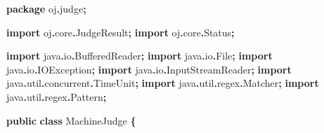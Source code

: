 \documentclass[
  11pt,
]{ctexart}
\newenvironment{Shaded}{\begin{snugshade}}{\end{snugshade}}
\newcommand{\ImportTok}[1]{#1}
\newcommand{\KeywordTok}[1]{\textcolor[rgb]{0.13,0.29,0.53}{\textbf{#1}}}
\newcommand{\NormalTok}[1]{#1}
\newcommand{\OperatorTok}[1]{\textcolor[rgb]{0.81,0.36,0.00}{\textbf{#1}}}
\begin{document}
\begin{Shaded}
\begin{Highlighting}[]
\KeywordTok{package}\ImportTok{ oj}\OperatorTok{.}\ImportTok{judge}\OperatorTok{;}

\KeywordTok{import} \ImportTok{oj}\OperatorTok{.}\ImportTok{core}\OperatorTok{.}\ImportTok{JudgeResult}\OperatorTok{;}
\KeywordTok{import} \ImportTok{oj}\OperatorTok{.}\ImportTok{core}\OperatorTok{.}\ImportTok{Status}\OperatorTok{;}

\KeywordTok{import} \ImportTok{java}\OperatorTok{.}\ImportTok{io}\OperatorTok{.}\ImportTok{BufferedReader}\OperatorTok{;}
\KeywordTok{import} \ImportTok{java}\OperatorTok{.}\ImportTok{io}\OperatorTok{.}\ImportTok{File}\OperatorTok{;}
\KeywordTok{import} \ImportTok{java}\OperatorTok{.}\ImportTok{io}\OperatorTok{.}\ImportTok{IOException}\OperatorTok{;}
\KeywordTok{import} \ImportTok{java}\OperatorTok{.}\ImportTok{io}\OperatorTok{.}\ImportTok{InputStreamReader}\OperatorTok{;}
\KeywordTok{import} \ImportTok{java}\OperatorTok{.}\ImportTok{util}\OperatorTok{.}\ImportTok{concurrent}\OperatorTok{.}\ImportTok{TimeUnit}\OperatorTok{;}
\KeywordTok{import} \ImportTok{java}\OperatorTok{.}\ImportTok{util}\OperatorTok{.}\ImportTok{regex}\OperatorTok{.}\ImportTok{Matcher}\OperatorTok{;}
\KeywordTok{import} \ImportTok{java}\OperatorTok{.}\ImportTok{util}\OperatorTok{.}\ImportTok{regex}\OperatorTok{.}\ImportTok{Pattern}\OperatorTok{;}

\KeywordTok{public} \KeywordTok{class}\NormalTok{ MachineJudge }\OperatorTok{\{}


\end{Highlighting}
\end{Shaded}
\end{document}
